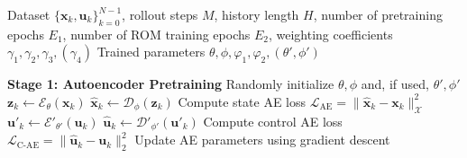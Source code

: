 \documentclass{article}
\begin{document}
\begin{algorithm}[!ht]
\caption{Training of Sequence-Based Control-Affine ROM (with optional Input Autoencoder)}
\label{alg:rom-training}
\begin{algorithmic}[1]
\REQUIRE Dataset $\{\mathbf{x}_k,\mathbf{u}_k\}_{k=0}^{N-1}$, rollout steps $M$, history length $H$, 
number of pretraining epochs $E_1$, number of ROM training epochs $E_2$, 
weighting coefficients $\gamma_1,\gamma_2,\gamma_3,(\gamma_4)$
\ENSURE Trained parameters $\theta,\phi,\varphi_1,\varphi_2,( \theta',\phi')$
\vspace{0.5em}

\STATE \textbf{Stage 1: Autoencoder Pretraining}
\STATE Randomly initialize $\theta,\phi$ and, if used, $\theta',\phi'$
    \STATE $\mathbf{z}_k \gets \mathcal{E}_\theta(\mathbf{x}_k)$
    \STATE $\hat{\mathbf{x}}_k \gets \mathcal{D}_\phi(\mathbf{z}_k)$
    \STATE Compute state AE loss $\mathcal{L}_{\text{AE}} = \|\hat{\mathbf{x}}_k - \mathbf{x}_k\|_{\mathcal{X}}^2$
      \STATE $\mathbf{u}'_k \gets \mathcal{E}'_{\theta'}(\mathbf{u}_k)$
      \STATE $\hat{\mathbf{u}}_k \gets \mathcal{D}'_{\phi'}(\mathbf{u}'_k)$
      \STATE Compute control AE loss $\mathcal{L}_{\text{C-AE}} = \|\hat{\mathbf{u}}_k - \mathbf{u}_k\|_2^2$
    \ENDIF
    \STATE Update AE parameters using gradient descent
  \ENDFOR
\ENDFOR
\vspace{0.5em}


\end{algorithmic}
\end{algorithm}
\end{document}
